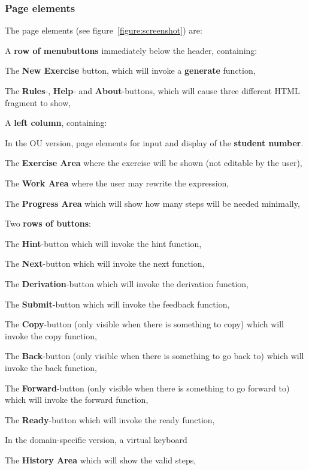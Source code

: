 \documentclass{article}
\begin{document}
\subsubsection{Page elements}
The page elements (see figure~\ref{figure:screenshot}) are:

A \textbf{row of menubuttons} immediately below the header, containing:
	\begin{compactitem}
	\item The \textbf{New Exercise} button, which will invoke a \textbf{generate} function,
	\item The \textbf{Rules}-, \textbf{Help}- and \textbf{About}-buttons, which will cause three different HTML fragment to show,
		\end{compactitem}

A \textbf{left column}, containing:
	\begin{compactitem}
	\item In the OU version, page elements for input and display of the \textbf{student number}.
	\item The \textbf{Exercise Area} where the exercise will be shown (not editable by the user),
	\item The \textbf{Work Area} where the user may rewrite the expression,
	\item The \textbf{Progress Area} which will show how many steps will be needed minimally,
	\item Two \textbf{rows of buttons}:
		\begin{compactitem}
		\item The \textbf{Hint}-button which will invoke the hint function,
		\item The \textbf{Next}-button which will invoke the next function,
		\item The \textbf{Derivation}-button which will invoke the derivation function,
		\item The \textbf{Submit}-button which will invoke the feedback function,
		\item The \textbf{Copy}-button (only visible when there is something to copy) which will invoke the copy function,
		\item The \textbf{Back}-button (only visible when there is something to go back to) which will invoke the back function,
		\item The \textbf{Forward}-button (only visible when there is something to go forward to) which will invoke the forward function,
		\item The \textbf{Ready}-button which will invoke the ready function,
		\item In the domain-specific version, a virtual keyboard
		\end{compactitem}
	\item The \textbf{History Area} which will show the valid steps,
	\end{compactitem}
\end{document}
